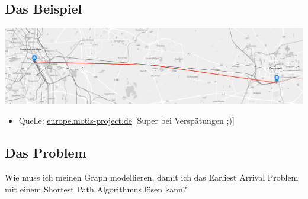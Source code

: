 \subsection{\textbf{Das} Beispiel}
\begin{frame}
	\includegraphics[width=\linewidth]{images/bahnstrecke-frankfurt-darmstadt.png}

	\hspace{5em}

	\begin{itemize}
		\item Quelle: \url{europe.motis-project.de} [Super bei Verspätungen ;)]
	\end{itemize}
\end{frame}

\subsection{Das Problem}
\begin{frame}
	\vspace{6em}
	\begin{center}
		\begin{Large}
			Wie muss ich meinen Graph modellieren, damit ich das Earliest Arrival Problem mit einem Shortest Path Algorithmus lösen kann?
		\end{Large}
	\end{center}
\end{frame}

